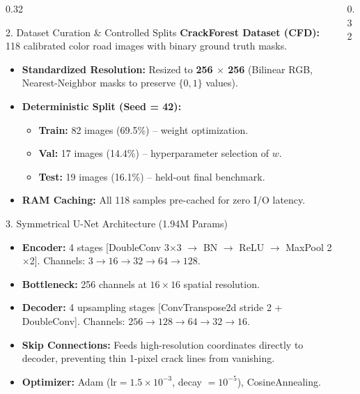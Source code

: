 \documentclass[final]{beamer}
\begin{document}
\begin{frame}[t]
\begin{columns}[t]
\begin{column}{0.32\textwidth}
\begin{block}{2. Dataset Curation \& Controlled Splits}
\small
\textbf{CrackForest Dataset (CFD):} 118 calibrated color road images with binary ground truth masks.
\begin{itemize}
    \item \textbf{Standardized Resolution:} Resized to \textbf{256 $\times$ 256} (Bilinear RGB, Nearest-Neighbor masks to preserve $\{0, 1\}$ values).
    \item \textbf{Deterministic Split (Seed = 42):}
    \begin{itemize}
        \item \textbf{Train:} 82 images (69.5\%) -- weight optimization.
        \item \textbf{Val:} 17 images (14.4\%) -- hyperparameter selection of $w$.
        \item \textbf{Test:} 19 images (16.1\%) -- held-out final benchmark.
    \end{itemize}
    \item \textbf{RAM Caching:} All 118 samples pre-cached for zero I/O latency.
\end{itemize}
\end{block}

\begin{block}{3. Symmetrical U-Net Architecture (1.94M Params)}
\small
\begin{itemize}
    \item \textbf{Encoder:} 4 stages [DoubleConv 3$\times$3 $\rightarrow$ BN $\rightarrow$ ReLU $\rightarrow$ MaxPool 2$\times$2]. Channels: $3 \rightarrow 16 \rightarrow 32 \rightarrow 64 \rightarrow 128$.
    \item \textbf{Bottleneck:} 256 channels at $16 \times 16$ spatial resolution.
    \item \textbf{Decoder:} 4 upsampling stages [ConvTranspose2d stride 2 + DoubleConv]. Channels: $256 \rightarrow 128 \rightarrow 64 \rightarrow 32 \rightarrow 16$.
    \item \textbf{Skip Connections:} Feeds high-resolution coordinates directly to decoder, preventing thin 1-pixel crack lines from vanishing.
    \item \textbf{Optimizer:} Adam ($\text{lr} = 1.5 \times 10^{-3}$, decay $= 10^{-5}$), CosineAnnealing.
\end{itemize}
\end{block}

\end{column}

\begin{column}{0.32\textwidth}


\end{column}
\end{columns}
\end{frame}
\end{document}
